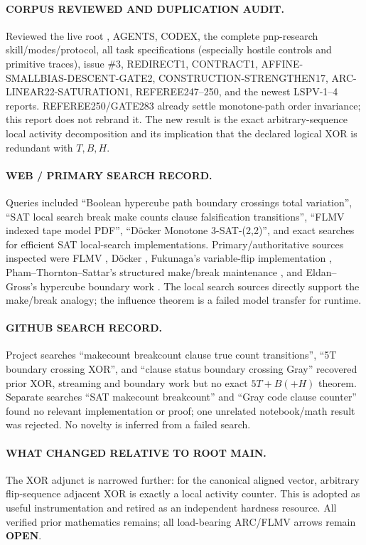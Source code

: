 \documentclass[11pt]{article}
\newcommand{\OPEN}{\textbf{OPEN}}
\begin{document}
\paragraph{CORPUS REVIEWED AND DUPLICATION AUDIT.}
Reviewed the live root , AGENTS, CODEX, the complete pnp-research
skill/modes/protocol, all task specifications (especially hostile controls and primitive
traces), issue \#3, REDIRECT1, CONTRACT1, AFFINE-SMALLBIAS-DESCENT-GATE2,
CONSTRUCTION-STRENGTHEN17, ARC-LINEAR22-SATURATION1, REFEREE247--250, and the newest
LSPV-1--4 reports.  REFEREE250/GATE283 already settle monotone-path order invariance;
this report does not rebrand it.  The new result is the exact arbitrary-sequence local
activity decomposition and its implication that the declared logical XOR is redundant
with $T,B,H$.

\paragraph{WEB / PRIMARY SEARCH RECORD.}
Queries included ``Boolean hypercube path boundary crossings total variation'', ``SAT
local search break make counts clause falsification transitions'', ``FLMV indexed tape
model PDF'', ``D\"ocker Monotone 3-SAT-(2,2)'', and exact searches for efficient SAT
local-search implementations.  Primary/authoritative sources inspected were FLMV
\cite{FLMV}, D\"ocker \cite{Doecker}, Fukunaga's variable-flip implementation
\cite{Fukunaga}, Pham--Thornton--Sattar's structured make/break maintenance
\cite{Pham}, and Eldan--Gross's hypercube boundary work \cite{EldanGross}.  The local
search sources directly support the make/break analogy; the influence theorem is a
failed model transfer for runtime.

\paragraph{GITHUB SEARCH RECORD.}
Project searches ``makecount breakcount clause true count transitions'', ``5T boundary
crossing XOR'', and ``clause status boundary crossing Gray'' recovered prior XOR,
streaming and boundary work but no exact $5T+B(+H)$ theorem.  Separate
 searches ``SAT makecount breakcount'' and ``Gray code clause
counter'' found no relevant implementation or proof; one unrelated notebook/math result
was rejected.  No novelty is inferred from a failed search.

\paragraph{WHAT CHANGED RELATIVE TO ROOT MAIN.}
The XOR adjunct is narrowed further: for the canonical aligned vector, arbitrary
flip-sequence adjacent XOR is exactly a local activity counter.  This is adopted as
useful instrumentation and retired as an independent hardness resource.  All verified
prior mathematics remains; all load-bearing ARC/FLMV arrows remain \OPEN.
\end{document}
